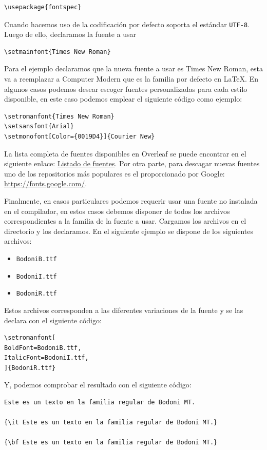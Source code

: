 \documentclass[a4,10pt]{aleph-notas}
\begin{document}
\begin{lstlisting}[frame=single]
\usepackage{fontspec}
\end{lstlisting}

Cuando hacemos uso de \XeLaTeX la codificación por defecto soporta el estándar \texttt{UTF-8}. Luego de ello, declaramos la fuente a usar

\begin{lstlisting}[frame=single]
\setmainfont{Times New Roman}
\end{lstlisting}

Para el ejemplo declaramos que la nueva fuente a usar es Times New Roman, esta va a reemplazar a Computer Modern que es la familia por defecto en \LaTeX{}. En algunos casos podemos desear escoger fuentes personalizadas para cada estilo disponible, en este caso podemos emplear el siguiente código como ejemplo:

\begin{lstlisting}[frame=single]
\setromanfont{Times New Roman}
\setsansfont{Arial}
\setmonofont[Color={0019D4}]{Courier New}
\end{lstlisting}

La lista completa de fuentes disponibles en Overleaf se puede encontrar en el siguiente enlace: \href{https://es.overleaf.com/learn/latex/Questions/Which\%20OTF\%20or\%20TTF\%20fonts\%20are\%20supported\%20via\%20fontspec\%3F}{Listado de fuentes}. Por otra parte, para descagar nuevas fuentes uno de los repositorios más populares es el proporcionado por Google: \url{https://fonts.google.com/}.


Finalmente, en casos particulares podemos requerir usar una fuente no instalada en el compilador, en estos casos debemos disponer de todos los archivos correspondientes a la familia de la fuente a usar. Cargamos los archivos en el directorio y los declaramos. En el siguiente ejemplo se dispone de los siguientes archivos:

\begin{itemize}
    \item \texttt{BodoniB.ttf}
    \item \texttt{BodoniI.ttf}
    \item \texttt{BodoniR.ttf}
\end{itemize}

Estos archivos corresponden a las diferentes variaciones de la fuente y se las declara con el siguiente código:

\begin{lstlisting}[frame=single]
\setromanfont[
BoldFont=BodoniB.ttf,
ItalicFont=BodoniI.ttf,
]{BodoniR.ttf}
\end{lstlisting}

Y, podemos comprobar el resultado con el siguiente código:

\begin{lstlisting}[frame=single]
Este es un texto en la familia regular de Bodoni MT.

{\it Este es un texto en la familia regular de Bodoni MT.}

{\bf Este es un texto en la familia regular de Bodoni MT.}

\end{lstlisting}
\end{document}
